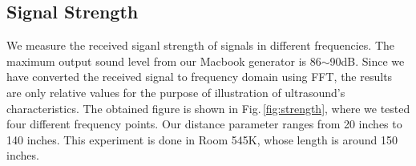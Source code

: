 


\subsection{Signal Strength}
\label{sec:signal-strength}
We measure the received siganl strength of signals in different frequencies. The maximum output sound level from our Macbook generator is 86$\sim$90dB. Since we have converted the received signal to frequency domain using FFT, the results are only relative values for the purpose of illustration of ultrasound's characteristics. The obtained figure is shown in Fig.\,\ref{fig:strength}, where we tested four different frequency points. Our distance parameter ranges from 20 inches to 140 inches. This experiment is done in Room 545K, whose length is around 150 inches. 

